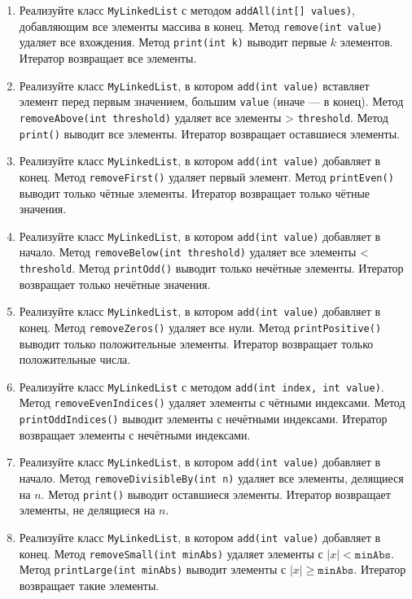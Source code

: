 \documentclass[12pt]{article}
\begin{document}
\begin{enumerate}
\item Реализуйте класс \texttt{MyLinkedList} с методом \texttt{addAll(int[] values)}, добавляющим все элементы массива в конец. Метод \texttt{remove(int value)} удаляет все вхождения. Метод \texttt{print(int k)} выводит первые $k$ элементов. Итератор возвращает все элементы.

\item Реализуйте класс \texttt{MyLinkedList}, в котором \texttt{add(int value)} вставляет элемент перед первым значением, большим \texttt{value} (иначе — в конец). Метод \texttt{removeAbove(int threshold)} удаляет все элементы > \texttt{threshold}. Метод \texttt{print()} выводит все элементы. Итератор возвращает оставшиеся элементы.

\item Реализуйте класс \texttt{MyLinkedList}, в котором \texttt{add(int value)} добавляет в конец. Метод \texttt{removeFirst()} удаляет первый элемент. Метод \texttt{printEven()} выводит только чётные элементы. Итератор возвращает только чётные значения.

\item Реализуйте класс \texttt{MyLinkedList}, в котором \texttt{add(int value)} добавляет в начало. Метод \texttt{removeBelow(int threshold)} удаляет все элементы < \texttt{threshold}. Метод \texttt{printOdd()} выводит только нечётные элементы. Итератор возвращает только нечётные значения.

\item Реализуйте класс \texttt{MyLinkedList}, в котором \texttt{add(int value)} добавляет в конец. Метод \texttt{removeZeros()} удаляет все нули. Метод \texttt{printPositive()} выводит только положительные элементы. Итератор возвращает только положительные числа.

\item Реализуйте класс \texttt{MyLinkedList} с методом \texttt{add(int index, int value)}. Метод \texttt{removeEvenIndices()} удаляет элементы с чётными индексами. Метод \texttt{printOddIndices()} выводит элементы с нечётными индексами. Итератор возвращает элементы с нечётными индексами.

\item Реализуйте класс \texttt{MyLinkedList}, в котором \texttt{add(int value)} добавляет в начало. Метод \texttt{removeDivisibleBy(int n)} удаляет все элементы, делящиеся на $n$. Метод \texttt{print()} выводит оставшиеся элементы. Итератор возвращает элементы, не делящиеся на $n$.

\item Реализуйте класс \texttt{MyLinkedList}, в котором \texttt{add(int value)} добавляет в конец. Метод \texttt{removeSmall(int minAbs)} удаляет элементы с $|x| < \texttt{minAbs}$. Метод \texttt{printLarge(int minAbs)} выводит элементы с $|x| \geq \texttt{minAbs}$. Итератор возвращает такие элементы.


\end{enumerate}
\end{document}
